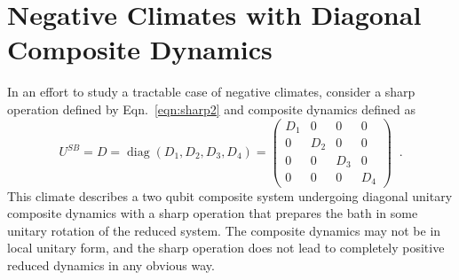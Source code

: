 \section{Negative Climates with Diagonal Composite Dynamics}
\label{sec:negclimate}

In an effort to study a tractable case of negative climates, consider a sharp operation defined by Eqn.\ \ref{eqn:sharp2} and composite dynamics defined as
$$
U^{SB} = D = \operatorname{diag}\left(D_1,D_2,D_3,D_4\right) = \begin{pmatrix}
D_1&0&0&0\\
0&D_2&0&0\\
0&0&D_3&0\\
0&0&0&D_4
\end{pmatrix}\;\;.
$$
This climate describes a two qubit composite system undergoing diagonal unitary composite dynamics with a sharp operation that prepares the bath in some unitary rotation of the reduced system.  The composite dynamics may not be in local unitary form, and the sharp operation does not lead to completely positive reduced dynamics in any obvious way.  

